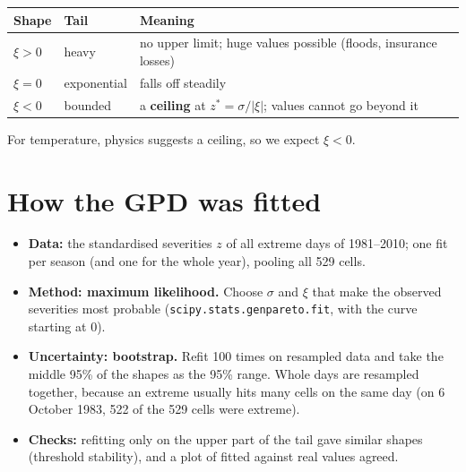 \begin{center}
\footnotesize
\begin{tabular}{lll}
\toprule
\textbf{Shape} & \textbf{Tail} & \textbf{Meaning}\\
\midrule
$\xi>0$ & heavy & no upper limit; huge values possible (floods, insurance losses)\\
$\xi=0$ & exponential & falls off steadily\\
$\xi<0$ & bounded & a \textbf{ceiling} at $z^*=\sigma/|\xi|$; values cannot go beyond it\\
\bottomrule
\end{tabular}
\end{center}
For temperature, physics suggests a ceiling, so we expect $\xi<0$.

\section{How the GPD was fitted}
\begin{itemize}
  \item \textbf{Data:} the standardised severities $z$ of all extreme days of 1981--2010; one fit per season (and one
        for the whole year), pooling all 529 cells.
  \item \textbf{Method: maximum likelihood.} Choose $\sigma$ and $\xi$ that make the observed severities most probable
        (\texttt{scipy.stats.genpareto.fit}, with the curve starting at 0).
  \item \textbf{Uncertainty: bootstrap.} Refit 100 times on resampled data and take the middle 95\% of the shapes as the
        95\% range. Whole days are resampled together, because an extreme usually hits many cells on the same day (on
        6 October 1983, 522 of the 529 cells were extreme).
  \item \textbf{Checks:} refitting only on the upper part of the tail gave similar shapes (threshold stability), and a
        plot of fitted against real values agreed.
\end{itemize}

